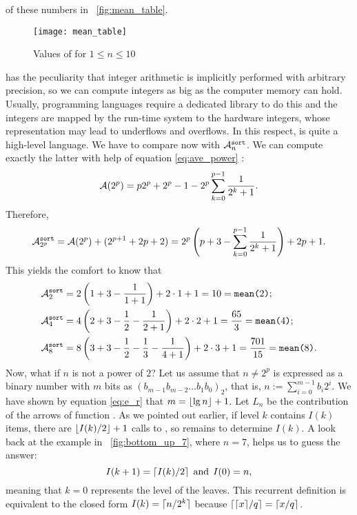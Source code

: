 of these numbers in \fig~\vref{fig:mean_table}.
\begin{figure}
\centering
\texttt{[image: mean\_table]}
\caption{Values of  for
         \(1 \leqslant n \leqslant 10\)
         \label{fig:mean_table}}
\end{figure}
\Erlang has the peculiarity that integer arithmetic is implicitly
performed with arbitrary precision, so we can compute integers as big
as the computer memory can hold. Usually, programming languages
require a dedicated library to do this and the integers are mapped by
the run\hyp{}time system to the hardware integers, whose
representation may lead to underflows and overflows. In this respect,
\Erlang is quite a high\hyp{}level language. We have to compare now
 with \(\ave{sort}{n}\). We can compute exactly
the latter with help of equation \eqref{eq:ave_power}
:
\[
\Aideal(2^p)
  = p2^p + 2^p - 1 - 2^p \sum_{k=0}^{p-1}\frac{1}{2^k+1}.
\]
Therefore,
\[
\ave{sort}{2^p}
  = \Aideal(2^p) + (2^{p+1}+2p+2)
  = 2^p\left(p + 3 - \sum_{k=0}^{p-1}\frac{1}{2^k+1}\right) + 2p + 1.
\]
This yields the comfort to know that
\begin{align*}
\ave{sort}{2} &= 2\left(1 + 3 - \frac{1}{1+1}\right) + 2 \cdot 1 + 1 =
10 = \erlcode{mean(\(2\))};\\
\ave{sort}{4} &= 4\left(2 + 3 - \frac{1}{2} - \frac{1}{2+1}\right) +
2 \cdot 2 + 1 = \frac{65}{3} = \erlcode{mean(\(4\))};\\
\ave{sort}{8} &= 8\left(3 + 3 - \frac{1}{2} - \frac{1}{3} -
\frac{1}{4+1}\right) + 2 \cdot 3 + 1 = \frac{701}{15} =
\erlcode{mean(\(8\))}.
\end{align*}
Now, what if \(n\) is not a power of \(2\)? Let us assume that \(n
\neq 2^p\) is expressed as a binary number with \(m\) bits as
\((b_{m-1}b_{m-2}\dots{b_1}{b_0})_2\), that is, \(n :=
\sum_{i=0}^{m-1}{b_i2^i}\). We have shown by equation \eqref{eq:e_r}
 that \(m=\floor{\lg n} + 1\). Let \(L_n\) be the
contribution of the arrows of function . As we
pointed out earlier, if level \(k\) contains \(I(k)\) items, there are
\(\floor{I(k)/2}+1\) calls to , so remains to
determine \(I(k)\). A look back at the example in
\fig~\vref{fig:bottom_up_7}, where \(n=7\), helps us to guess the
answer:
\[
I(k+1) = \ceiling{I(k)/2}\,\; \text{and} \,\; I(0) = n,
\]
meaning that \(k=0\) represents the level of the leaves. This
recurrent definition is equivalent to the closed form \(I(k) =
\ceiling{n/2^k}\) because \(\ceiling{\ceiling{x}/q} = \ceiling{x/q}\).
